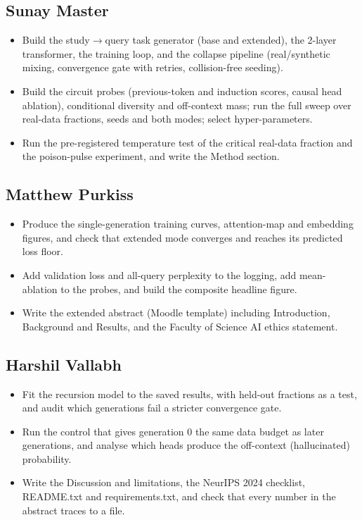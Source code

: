 \documentclass[11pt,a4paper]{article}
\begin{document}
\subsection*{Sunay Master}
\begin{itemize}
  \item Build the study$\to$query task generator (base and extended), the 2-layer transformer,
        the training loop, and the collapse pipeline (real/synthetic mixing, convergence gate
        with retries, collision-free seeding).
  \item Build the circuit probes (previous-token and induction scores, causal head ablation),
        conditional diversity and off-context mass; run the full sweep over real-data
        fractions, seeds and both modes; select hyper-parameters.
  \item Run the pre-registered temperature test of the critical real-data fraction and the
        poison-pulse experiment, and write the Method section.
\end{itemize}

\subsection*{Matthew Purkiss}
\begin{itemize}
  \item Produce the single-generation training curves, attention-map and embedding figures,
        and check that extended mode converges and reaches its predicted loss floor.
  \item Add validation loss and all-query perplexity to the logging, add mean-ablation to the
        probes, and build the composite headline figure.
  \item Write the extended abstract (Moodle template) including Introduction, Background and
        Results, and the Faculty of Science AI ethics statement.
\end{itemize}

\subsection*{Harshil Vallabh}
\begin{itemize}
  \item Fit the recursion model to the saved results, with held-out fractions as a test, and
        audit which generations fail a stricter convergence gate.
  \item Run the control that gives generation 0 the same data budget as later generations, and
        analyse which heads produce the off-context (hallucinated) probability.
  \item Write the Discussion and limitations, the NeurIPS 2024 checklist, README.txt and
        requirements.txt, and check that every number in the abstract traces to a file.
\end{itemize}
\end{document}
